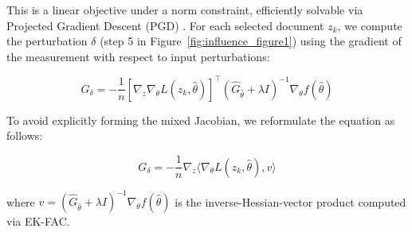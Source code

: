 \documentclass{article}
\theoremstyle{plain}
\theoremstyle{definition}
\theoremstyle{remark}
\begin{document}
This is a linear objective under a norm constraint, efficiently solvable via Projected Gradient Descent (PGD) \citep{madry2017towards}. For each selected document $z_k$, we compute the perturbation $\delta$ (step 5 in Figure~\ref{fig:influence_figure1}) using the gradient of the measurement with respect to input perturbations:

\begin{equation}
G_\delta = -\frac{1}{n} [\nabla_z \nabla_\theta L(z_k, \hat{\theta})]^\top (\hat{G}_{\hat{\theta}} + \lambda I)^{-1} \nabla_\theta f(\hat{\theta})
\end{equation}

To avoid explicitly forming the mixed Jacobian, we reformulate the equation as follows:

\begin{equation}
G_\delta = -\frac{1}{n} \nabla_z \langle \nabla_\theta L(z_k, \hat{\theta}), v \rangle
\end{equation}

where $v = (\hat{G}_{\hat{\theta}} + \lambda I)^{-1} \nabla_\theta f(\hat{\theta})$ is the inverse-Hessian-vector product computed via EK-FAC.




    

\end{document}
